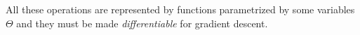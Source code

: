 \documentclass[orivec]{llncs}
\newcommand{\vect}[1]{\boldsymbol{#1}}
\begin{document}
All these operations are represented by functions parametrized by some variables $\Theta$ and they must be made \textit{differentiable} for gradient descent.

\end{document}
